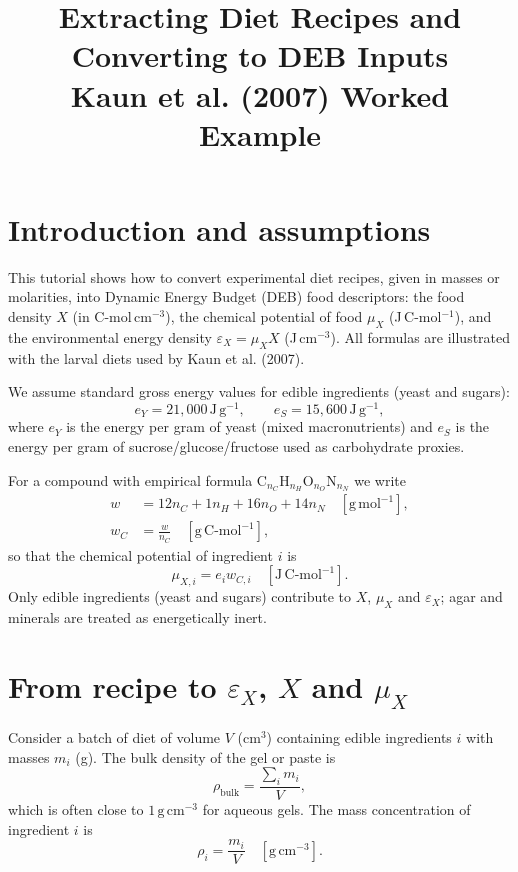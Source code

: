 \documentclass[11pt]{article}
\title{Extracting Diet Recipes and Converting to DEB Inputs\\Kaun et al. (2007) Worked Example}
\author{}
\date{}
\begin{document}
\maketitle

\section{Introduction and assumptions}

This tutorial shows how to convert experimental diet recipes, given in masses or molarities, into Dynamic Energy Budget (DEB) food descriptors: the food density $X$ (in C-mol\,cm$^{-3}$), the chemical potential of food $\mu_X$ (J\,C-mol$^{-1}$), and the environmental energy density $\varepsilon_X = \mu_X X$ (J\,cm$^{-3}$). All formulas are illustrated with the larval diets used by Kaun et al. (2007).

We assume standard gross energy values for edible ingredients (yeast and sugars):
\begin{equation}
  e_Y = 21{,}000\,\mathrm{J\,g^{-1}}, \qquad e_S = 15{,}600\,\mathrm{J\,g^{-1}},
\end{equation}
where $e_Y$ is the energy per gram of yeast (mixed macronutrients) and $e_S$ is the energy per gram of sucrose/glucose/fructose used as carbohydrate proxies.

For a compound with empirical formula C$_{n_C}$H$_{n_H}$O$_{n_O}$N$_{n_N}$ we write
\begin{align}
  w &= 12 n_C + 1 n_H + 16 n_O + 14 n_N\quad [\mathrm{g\,mol^{-1}}],\\
  w_C &= \frac{w}{n_C}\quad [\mathrm{g\,C\text{-}mol^{-1}}],
\end{align}
so that the chemical potential of ingredient $i$ is
\begin{equation}
  \mu_{X,i} = e_i w_{C,i}\quad [\mathrm{J\,C\text{-}mol^{-1}}].
\end{equation}
Only edible ingredients (yeast and sugars) contribute to $X$, $\mu_X$ and $\varepsilon_X$; agar and minerals are treated as energetically inert.

\section{From recipe to $\varepsilon_X$, $X$ and $\mu_X$}

Consider a batch of diet of volume $V$ (cm$^3$) containing edible ingredients $i$ with masses $m_i$ (g). The bulk density of the gel or paste is
\begin{equation}
  \rho_{\text{bulk}} = \frac{\sum_i m_i}{V},
\end{equation}
which is often close to $1\,\mathrm{g\,cm^{-3}}$ for aqueous gels. The mass concentration of ingredient $i$ is
\begin{equation}
  \rho_i = \frac{m_i}{V}\quad [\mathrm{g\,cm^{-3}}].
\end{equation}
\end{document}
